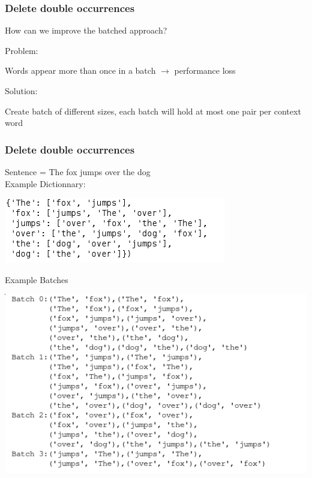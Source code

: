 
  \begin{frame}
\frametitle{Delete double occurrences}
\begin{Large}
How can we improve the batched approach? \\
\end{Large}
\begin{Large}
Problem:\\
\end{Large}
Words appear more than once in a batch $\rightarrow$ performance loss\\
\begin{Large}
Solution:\\
\end{Large}
Create batch of different sizes, each batch will hold at most one pair per context word\\
  \end{frame}

  
    \begin{frame}
\frametitle{Delete double occurrences}
\begin{Large}
Sentence = The fox jumps over the dog\\
Example Dictionnary:\\
\end{Large}
\includegraphics[scale=0.5]{images/dict_ex}\\
\begin{Large}
Example Batches
\end{Large}
\includegraphics[scale=0.4]{images/batch_ex}
  \end{frame}
  
